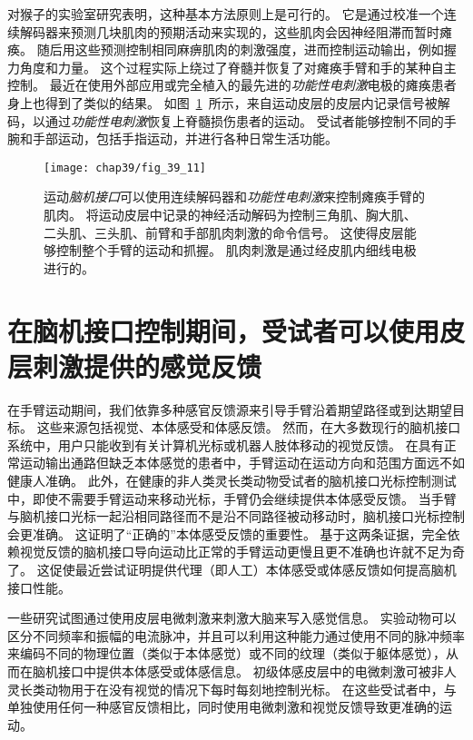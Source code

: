 对猴子的实验室研究表明，这种基本方法原则上是可行的。
它是通过校准一个连续解码器来预测几块肌肉的预期活动来实现的，这些肌肉会因神经阻滞而暂时瘫痪。
随后用这些预测控制相同麻痹肌肉的刺激强度，进而控制运动输出，例如握力角度和力量。
这个过程实际上绕过了脊髓并恢复了对瘫痪手臂和手的某种自主控制。
最近在使用外部应用或完全植入的最先进的\textit{功能性电刺激}电极的瘫痪患者身上也得到了类似的结果。
如图~\ref{fig:39_11}~所示，来自运动皮层的皮层内记录信号被解码，以通过\textit{功能性电刺激}恢复上脊髓损伤患者的运动。
受试者能够控制不同的手腕和手部运动，包括手指运动，并进行各种日常生活功能。


\begin{figure}[htbp]
	\centering
	\texttt{[image: chap39/fig\_39\_11]}
	\caption{运动\textit{脑机接口}可以使用连续解码器和\textit{功能性电刺激}来控制瘫痪手臂的肌肉。
		将运动皮层中记录的神经活动解码为控制三角肌、胸大肌、二头肌、三头肌、前臂和手部肌肉刺激的命令信号。
		这使得皮层能够控制整个手臂的运动和抓握。
		肌肉刺激是通过经皮肌内细线电极进行的\cite{ajiboye2017restoration}。}
	\label{fig:39_11}
\end{figure}



\section{在脑机接口控制期间，受试者可以使用皮层刺激提供的感觉反馈}

在手臂运动期间，我们依靠多种感官反馈源来引导手臂沿着期望路径或到达期望目标。
这些来源包括视觉、本体感受和体感反馈。
然而，在大多数现行的脑机接口系统中，用户只能收到有关计算机光标或机器人肢体移动的视觉反馈。
在具有正常运动输出通路但缺乏本体感觉的患者中，手臂运动在运动方向和范围方面远不如健康人准确。
此外，在健康的非人类灵长类动物受试者的脑机接口光标控制测试中，即使不需要手臂运动来移动光标，手臂仍会继续提供本体感受反馈。
当手臂与脑机接口光标一起沿相同路径而不是沿不同路径被动移动时，脑机接口光标控制会更准确。
这证明了“正确的”本体感受反馈的重要性。
基于这两条证据，完全依赖视觉反馈的脑机接口导向运动比正常的手臂运动更慢且更不准确也许就不足为奇了。
这促使最近尝试证明提供代理（即人工）本体感受或体感反馈如何提高脑机接口性能。


一些研究试图通过使用皮层电微刺激来刺激大脑来写入感觉信息。
实验动物可以区分不同频率和振幅的电流脉冲，并且可以利用这种能力通过使用不同的脉冲频率来编码不同的物理位置（类似于本体感觉）或不同的纹理（类似于躯体感觉），从而在脑机接口中提供本体感受或体感信息。
初级体感皮层中的电微刺激可被非人灵长类动物用于在没有视觉的情况下每时每刻地控制光标。
在这些受试者中，与单独使用任何一种感官反馈相比，同时使用电微刺激和视觉反馈导致更准确的运动。


